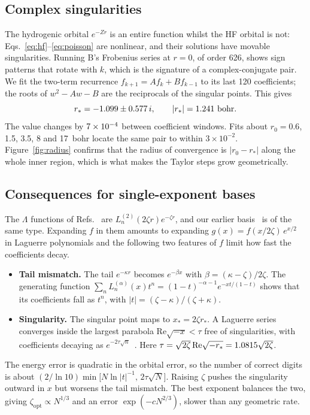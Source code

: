 \documentclass[aps,pra,reprint,superscriptaddress,amsmath,amssymb,longbibliography]{revtex4-2}
\begin{document}
\subsection{Complex singularities}

The hydrogenic orbital $e^{-Zr}$ is an entire function whilst the HF orbital is not: Eqs.~\eqref{eq:hf}--\eqref{eq:poisson} are nonlinear, and their solutions have movable singularities. Running B's Frobenius series at $r=0$, of order 626, shows sign patterns that rotate with $k$, which is the signature of a complex-conjugate pair. We fit the two-term recurrence $f_{k+1}=Af_k+Bf_{k-1}$ to its last 120 coefficients; the roots of $w^2-Aw-B$ are the reciprocals of the singular points. This gives
\begin{equation}
r_*=-1.099\pm0.577\,i,\qquad |r_*|=1.241\ \text{bohr}. \label{eq:rstar}
\end{equation}
The value changes by $7\times10^{-4}$ between coefficient windows. Fits about $r_0=0.6$, 1.5, 3.5, 8 and 17~bohr locate the same pair to within $3\times10^{-2}$. Figure~\ref{fig:radius} confirms that the radius of convergence is $|r_0-r_*|$ along the whole inner region, which is what makes the Taylor steps grow geometrically.

\subsection{Consequences for single-exponent bases}

The $\Lambda$ functions of Refs.~\cite{Hatano2020,Hatano2025} are $L^{(2)}_n(2\zeta r)e^{-\zeta r}$, and our earlier basis~\cite{King2018} is of the same type. Expanding $f$ in them amounts to expanding $g(x)=f(x/2\zeta)\,e^{x/2}$ in Laguerre polynomials and the following two features of $f$ limit how fast the coefficients decay.
\begin{itemize}
\item \textbf{Tail mismatch.} The tail $e^{-\kappa r}$ becomes $e^{-\beta x}$ with $\beta=(\kappa-\zeta)/2\zeta$. The generating function $\sum_nL^{(\alpha)}_n(x)t^n=(1-t)^{-\alpha-1}e^{-xt/(1-t)}$ shows that its coefficients fall as $t^n$, with $|t|=(\zeta-\kappa)/(\zeta+\kappa)$.
\item \textbf{Singularity.} The singular point maps to $x_*=2\zeta r_*$. A Laguerre series converges inside the largest parabola $\mathrm{Re}\sqrt{-x}<\tau$ free of singularities, with coefficients decaying as $e^{-2\tau\sqrt n}$~\cite{Szego1975}. Here $\tau=\sqrt{2\zeta}\,\mathrm{Re}\sqrt{-r_*}=1.0815\sqrt{2\zeta}$.
\end{itemize}
The energy error is quadratic in the orbital error, so the number of correct digits is about $(2/\ln10)\min\!\big[N\ln|t|^{-1},\,2\tau\sqrt N\big]$. Raising $\zeta$ pushes the singularity outward in $x$ but worsens the tail mismatch. The best exponent balances the two, giving $\zeta_\mathrm{opt}\propto N^{1/3}$ and an error $\exp(-cN^{2/3})$, slower than any geometric rate.
\end{document}
